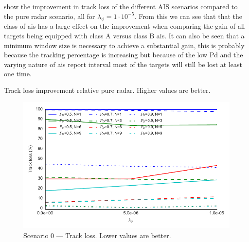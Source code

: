  show the improvement in track loss of the different AIS scenarios compared to the pure radar scenario, all for \(\lambda_\phi = 1\cdot 10^{-5}\). From this we can see that that the class of \gls{ais} has a large effect on the improvement when comparing the gain of all targets being equipped with class A versus class B \gls{ais}. It can also be seen that a minimum window size is necessary to achieve a substantial gain, this is probably because the tracking percentage is increasing but because of the low \gls{Pd} and the varying nature of \gls{ais} report interval most of the targets will still be lost at least one time.

\begin{table}[H]
\centering
{}
\caption{Track loss improvement relative pure radar. Higher values are better.}\label{tab:track_loss_improvement}
\end{table}

\begin{figure}
\centering
\includegraphics{Figures/plots/Scenario0_Tracking-TrackLoss.pdf}
\caption{Scenario 0 --- Track loss. Lower values are better.}\label{fig:scenario0_track_loss}
\end{figure}


